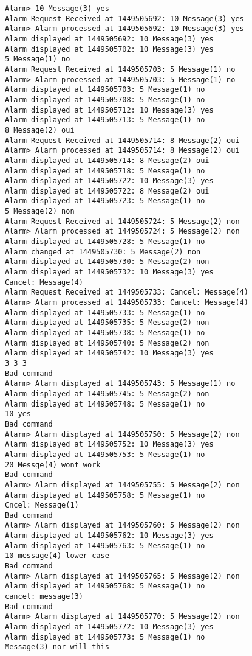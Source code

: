 \documentclass[11pt]{article}
\begin{document}
\begin{Verbatim}[tabsize=8]
Alarm> 10 Message(3) yes
Alarm Request Received at 1449505692: 10 Message(3) yes
Alarm> Alarm processed at 1449505692: 10 Message(3) yes
Alarm displayed at 1449505692: 10 Message(3) yes
Alarm displayed at 1449505702: 10 Message(3) yes
5 Message(1) no
Alarm Request Received at 1449505703: 5 Message(1) no
Alarm> Alarm processed at 1449505703: 5 Message(1) no
Alarm displayed at 1449505703: 5 Message(1) no
Alarm displayed at 1449505708: 5 Message(1) no
Alarm displayed at 1449505712: 10 Message(3) yes
Alarm displayed at 1449505713: 5 Message(1) no
8 Message(2) oui
Alarm Request Received at 1449505714: 8 Message(2) oui
Alarm> Alarm processed at 1449505714: 8 Message(2) oui
Alarm displayed at 1449505714: 8 Message(2) oui
Alarm displayed at 1449505718: 5 Message(1) no
Alarm displayed at 1449505722: 10 Message(3) yes
Alarm displayed at 1449505722: 8 Message(2) oui
Alarm displayed at 1449505723: 5 Message(1) no
5 Message(2) non
Alarm Request Received at 1449505724: 5 Message(2) non
Alarm> Alarm processed at 1449505724: 5 Message(2) non
Alarm displayed at 1449505728: 5 Message(1) no
Alarm changed at 1449505730: 5 Message(2) non
Alarm displayed at 1449505730: 5 Message(2) non
Alarm displayed at 1449505732: 10 Message(3) yes
Cancel: Message(4)
Alarm Request Received at 1449505733: Cancel: Message(4)
Alarm> Alarm processed at 1449505733: Cancel: Message(4)
Alarm displayed at 1449505733: 5 Message(1) no
Alarm displayed at 1449505735: 5 Message(2) non
Alarm displayed at 1449505738: 5 Message(1) no
Alarm displayed at 1449505740: 5 Message(2) non
Alarm displayed at 1449505742: 10 Message(3) yes
3 3 3
Bad command
Alarm> Alarm displayed at 1449505743: 5 Message(1) no
Alarm displayed at 1449505745: 5 Message(2) non
Alarm displayed at 1449505748: 5 Message(1) no
10 yes
Bad command
Alarm> Alarm displayed at 1449505750: 5 Message(2) non
Alarm displayed at 1449505752: 10 Message(3) yes
Alarm displayed at 1449505753: 5 Message(1) no
20 Messge(4) wont work
Bad command
Alarm> Alarm displayed at 1449505755: 5 Message(2) non
Alarm displayed at 1449505758: 5 Message(1) no
Cncel: Message(1)
Bad command
Alarm> Alarm displayed at 1449505760: 5 Message(2) non
Alarm displayed at 1449505762: 10 Message(3) yes
Alarm displayed at 1449505763: 5 Message(1) no
10 message(4) lower case
Bad command
Alarm> Alarm displayed at 1449505765: 5 Message(2) non
Alarm displayed at 1449505768: 5 Message(1) no
cancel: message(3)
Bad command
Alarm> Alarm displayed at 1449505770: 5 Message(2) non
Alarm displayed at 1449505772: 10 Message(3) yes
Alarm displayed at 1449505773: 5 Message(1) no
Message(3) nor will this

\end{Verbatim}
\end{document}
